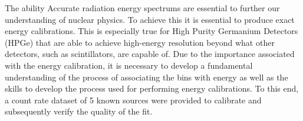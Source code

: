 	The ability Accurate radiation energy spectrums are essential to further our understanding of nuclear physics. To achieve this it is essential to produce exact energy calibrations. This is especially true for High Purity Germanium Detectors (HPGe) that are able to achieve high-energy resolution beyond what other detectors, such as scintillators, are capable of. Due to the importance associated with the energy calibration, it is necessary to develop a fundamental understanding of the process of associating the bins with energy as well as the skills to develop the process used for performing energy calibrations. To this end, a count rate dataset of 5 known sources were provided to calibrate and subsequently verify the quality of the fit.

